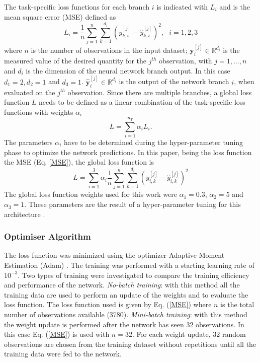 \documentclass[9pt,twocolumn,twoside,pdftex]{optica}
\begin{document}
The task-specific loss functions for each branch $i$ is indicated with $L_i$ and is the mean square error (MSE) defined as
\begin{equation}
L_i = \frac{1}{n} \sum_{j=1}^n \sum_{k=1}^{d_i} (y_{k,i}^{[j]}-\hat y_{k,i}^{[j]})^2, \ \ \ i=1,2,3
\label{MSE}
\end{equation}
where $n$ is the number of observations in the input dataset; ${\mathbold y}_i^{[j]} \in \mathbb{R}^{d_i}$ is the measured value of the desired quantity for the $j^{th}$ observation, with $j=1, ..., n$  and $d_i$ is the dimension of the neural network branch output. In this case $d_1=2, d_2=1$ and $d_3=1$. $ \hat {\mathbold y}_i^{[j]} \in \mathbb{R}^{d_i}$ is the output of the network branch $i$, when evaluated on the $j^{th}$ observation. Since there are multiple branches, a global loss function $L$ needs to be defined as a linear combination of the task-specific loss functions with weights $\alpha_i$ 
\begin{equation}
L = \sum_{i=1}^{n_T}\alpha_i L_i .
\label{globalcf}
\end{equation}
The parameters $\alpha_i$ have to be determined during the hyper-parameter tuning phase to optimize the network predictions.
In this paper, being the loss function the MSE (Eq. \ref{MSE}), the global loss function is
\begin{equation}
L = \sum_{i=1}^{3}\alpha_i \frac{1}{n} \sum_{j=1}^n \sum_{k=1}^{d_i} (y_{i,k}^{[j]}-\hat y_{i,k}^{[j]})^2
\end{equation}
The global loss function weights used for this work were $\alpha_1 = 0.3$, $\alpha_2 = 5$ and $\alpha_3 = 1$. These parameters are the result of a hyper-parameter tuning for this architecture \cite{Michelucci2019_2}.
 

\subsubsection{Optimiser Algorithm}
\label{training}

The loss function was minimized using the optimizer Adaptive Moment Estimation (Adam) \cite{Kingma2014, Michelucci2017}. The training was performed with a starting learning rate of $10^{-3}$. Two types of training were investigated to compare the training efficiency and performance of the network. {\sl No-batch training}: with this method all the training data  are used to perform an update of the weights and to evaluate the loss function. The loss function used is given by Eq. (\ref{MSE}) where $n$ is the total number of observations available (3780). {\sl Mini-batch training}: with this method the weight update is performed after the network has seen 32 observations. In this case Eq. (\ref{MSE}) is used with $n=32$. For each weight update, 32 random observations are chosen from the training dataset without repetitions until all the training data were fed to the network.  
\end{document}
